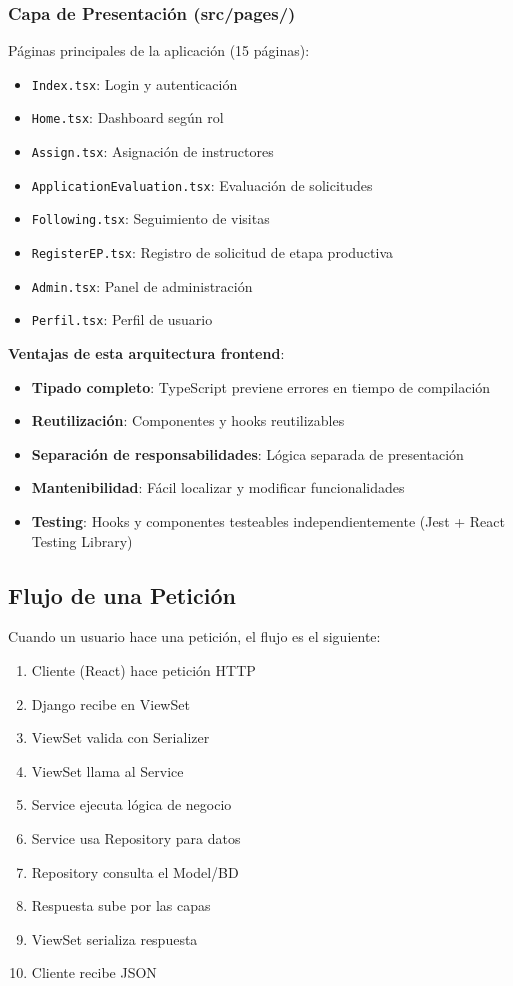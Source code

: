 \subsubsection{Capa de Presentación (src/pages/)}

Páginas principales de la aplicación (15 páginas):

\begin{itemize}
    \item \texttt{Index.tsx}: Login y autenticación
    \item \texttt{Home.tsx}: Dashboard según rol
    \item \texttt{Assign.tsx}: Asignación de instructores
    \item \texttt{ApplicationEvaluation.tsx}: Evaluación de solicitudes
    \item \texttt{Following.tsx}: Seguimiento de visitas
    \item \texttt{RegisterEP.tsx}: Registro de solicitud de etapa productiva
    \item \texttt{Admin.tsx}: Panel de administración
    \item \texttt{Perfil.tsx}: Perfil de usuario
\end{itemize}

\textbf{Ventajas de esta arquitectura frontend}:
\begin{itemize}
    \item \textbf{Tipado completo}: TypeScript previene errores en tiempo de compilación
    \item \textbf{Reutilización}: Componentes y hooks reutilizables
    \item \textbf{Separación de responsabilidades}: Lógica separada de presentación
    \item \textbf{Mantenibilidad}: Fácil localizar y modificar funcionalidades
    \item \textbf{Testing}: Hooks y componentes testeables independientemente (Jest + React Testing Library)
\end{itemize}

\subsection{Flujo de una Petición}

Cuando un usuario hace una petición, el flujo es el siguiente:

\begin{enumerate}
    \item Cliente (React) hace petición HTTP
    \item Django recibe en ViewSet
    \item ViewSet valida con Serializer
    \item ViewSet llama al Service
    \item Service ejecuta lógica de negocio
    \item Service usa Repository para datos
    \item Repository consulta el Model/BD
    \item Respuesta sube por las capas
    \item ViewSet serializa respuesta
    \item Cliente recibe JSON
\end{enumerate}

